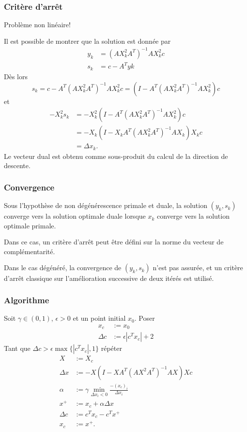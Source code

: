 \documentclass[t,usepdftitle=false]{beamer}
\begin{document}
\begin{frame}
	\frametitle{Critère d’arrêt}
	
	Problème non linéaire!
		
	\mbox{}
	
	Il est possible de montrer que la solution est donnée par
	\begin{align*}
		y_k &= (AX^2_kA^T)^{-1}AX^2_kc \\
		s_k &= c - A^Tyk
	\end{align*}
	Dès lors
	$$
	s_k = c - A^T(AX^2_kA^T)^{-1}AX^2_kc = (I - A^T(AX^2_kA^T)^{-1}AX^2_k)c
	$$
	et
	\begin{align*}
		-X^2_ks_k &= -X^2_k(I - A^T(AX^2_kA^T)^{-1}AX^2_k)c \\
		&= -X_k(I - X_kA^T(AX^2_kA^T)^{-1}AX_k)X_kc \\
		&= \Delta x_k.
	\end{align*}
	Le vecteur dual est obtenu comme sous-produit du calcul
	de la direction de descente.
	
\end{frame}

\begin{frame}
	\frametitle{Convergence}
	
	Sous l'hypothèse de non dégénérescence primale et duale, la solution $(y_k, s_k)$ converge vers la solution optimale duale lorsque $x_k$ converge vers la solution optimale primale.
	
	\mbox{}
	
	Dans ce cas, un critère d'arrêt peut être défini sur la norme
	du vecteur de complémentarité.
	
	\mbox{}
	
	Dans le cas dégénéré, la convergence de $(y_k, s_k)$ n'est pas assurée, et un critère d'arrêt classique sur l'amélioration successive de deux itérés est utilisé.
	
\end{frame}

\begin{frame}
	\frametitle{Algorithme}
	
	Soit $\gamma \in (0,1)$, $\epsilon > 0$ et un point initial $x_0$.
	Poser
	\begin{align*}
		x_c &:= x_0 \\
		\Delta c &:= \epsilon|c^Tx_c|+2
	\end{align*}
	Tant que $\Delta c > \epsilon\max\{|c^Tx_c|,1\}$ répéter
	\begin{align*}
		X &:= X_c \\
		\Delta x &:= -X(I - XA^T(AX^2A^T)^{-1}AX)Xc \\
		\alpha &:= \gamma \min_{\Delta x_i < 0} \frac{-(x_c)_i}{\Delta x_i} \\
		x^+ &:= x_c + \alpha \Delta x \\
		\Delta c &:= c^Tx_c - c^Tx^+ \\
		x_c &:= x^+.
	\end{align*}
	
\end{frame}
\end{document}
